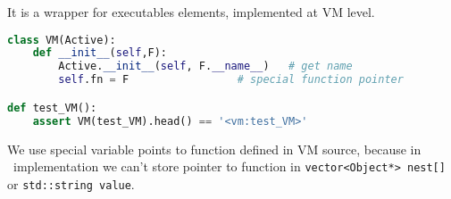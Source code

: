 \clearpage{}\label{VMcommand}

It is a wrapper for executables elements, implemented at VM level.
\begin{lstlisting}[language=Python]
class VM(Active):
	def __init__(self,F):
		Active.__init__(self, F.__name__)   # get name
		self.fn = F					# special function pointer

def test_VM():
	assert VM(test_VM).head() == '<vm:test_VM>'
\end{lstlisting}

\noindent
We use special variable points to function defined in VM source, because in
\cpp\ implementation we can't store pointer to function in
\verb|vector<Object*> nest[]| or \verb|std::string value|.
